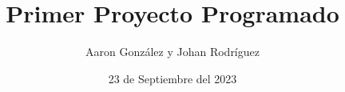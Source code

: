 \documentclass{lib/preamble}
\begin{document}

\title{Primer Proyecto Programado}
\author{Aaron González y Johan Rodríguez}
\date{23 de Septiembre del 2023}

\maketitle









\end{document}
